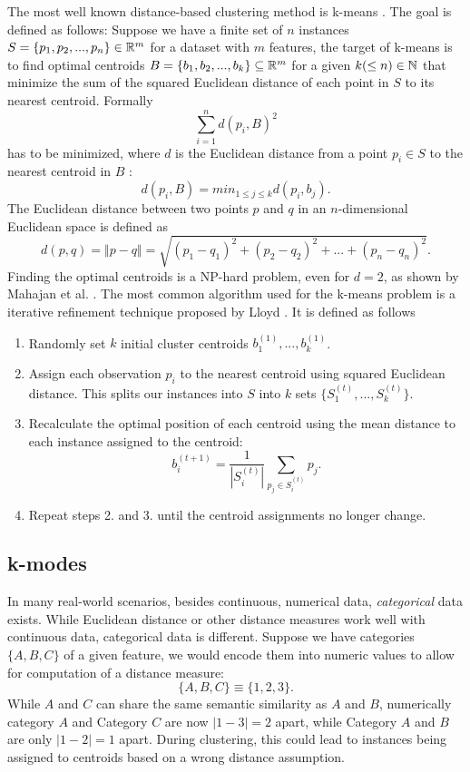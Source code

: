 The most well known distance-based clustering method is k-means \cite{kmeans}. The goal is defined as follows: Suppose we have a finite set of $n$ instances $S=\{p_1, p_2, ..., p_n\} \in \mathbb{R}^m$ for a dataset with $m$ features, the target of k-means is to find optimal centroids $B=\{b_1, b_2, ..., b_k\} \subseteq \mathbb{R}^m$ for a given $k (\leq n) \in \mathbb{N}$ that minimize the sum of the squared Euclidean distance of each point in $S$ to its nearest centroid. Formally
$$\sum_{i=1}^n  d(p_i, B)^2$$
has to be minimized, where $d$ is the Euclidean distance from a point $p_i \in S$ to the nearest centroid in $B$ \cite{kmeans_np_hard}:
$$d(p_i, B) = min_{1 \leq j \leq k} d(p_i, b_j).$$
The Euclidean distance between two points $p$ and $q$ in an $n$-dimensional Euclidean space is defined as 
$$d(p, q) = \Vert p - q \Vert = \sqrt{(p_1 - q_1)^2 + (p_2 - q_2)^2 + ... + (p_n - q_n)^2}.$$
Finding the optimal centroids is a NP-hard problem, even for $d=2$, as shown by Mahajan et al. \cite{kmeans_np_hard}. The most common algorithm used for the k-means problem is a iterative refinement technique proposed by Lloyd \cite{kmeans_lloyd}. It is defined as follows
\begin{enumerate} 
	\item Randomly set $k$ initial cluster centroids $b_1^{(1)}, ..., b_k^{(1)}$.
	\item Assign each observation $p_i$ to the nearest centroid using squared Euclidean distance. This splits our instances into $S$ into $k$ sets $\{S_1^{(t)}, ..., S_k^{(t)}\}$.
	\item Recalculate the optimal position of each centroid using the mean distance to each instance assigned to the centroid: 
$$b_i^{(t+1)} = \frac{1}{|S_i^{(t)}|} \sum_{p_j \in S_i^{(t)}} p_j.$$
	\item Repeat steps 2. and 3. until the centroid assignments no longer change.
\end{enumerate}

\subsection{k-modes} \label{k-modes}

In many real-world scenarios, besides continuous, numerical data, \textit{categorical} data exists. While Euclidean distance or other distance measures work well with continuous data, categorical data is different. Suppose we have categories $\{A, B, C\}$ of a given feature, we would encode them into numeric values to allow for computation of a distance measure:
$$\{A, B, C\} \equiv \{1, 2, 3\}.$$
While $A$ and $C$ can share the same semantic similarity as $A$ and $B$, numerically category $A$ and Category $C$ are now $|1-3| = 2$ apart, while Category $A$ and $B$ are only $|1-2|=1$ apart. During clustering, this could lead to instances being assigned to centroids based on a wrong distance assumption.

